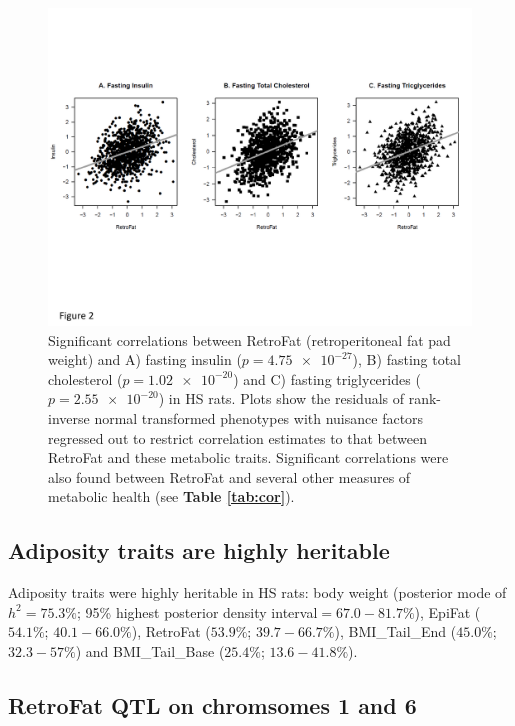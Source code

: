 \begin{figure}
\centering
\includegraphics[trim={0in 2in 0in 1.5in}, clip, width=\textwidth]{figures/5-hsrats/Figure2.pdf}
\caption[Significant correlations between adiposity and metabolic traits in HS rats]{Significant correlations between RetroFat (retroperitoneal fat pad weight) and A) fasting insulin ($p = \num{4.75e-27}$), B) fasting total cholesterol ($p = \num{1.02e-20}$) and C) fasting triglycerides ($p = \num{2.55e-20}$) in HS rats. Plots show the residuals of rank-inverse normal transformed phenotypes with nuisance factors regressed out to restrict correlation estimates to that between RetroFat and these metabolic traits. Significant correlations were also found between RetroFat and several other measures of metabolic health (see \textbf{Table \ref{tab:cor}}). \label{fig:adiposity_cor}}
\end{figure}

\subsection{Adiposity traits are highly heritable}

Adiposity traits were highly heritable in HS rats: body weight (posterior mode of $h^{2} = 75.3\%$; 95\% highest posterior density interval$ = 67.0-81.7\%$), EpiFat ($54.1\%$; $40.1-66.0\%$), RetroFat ($53.9\%$; $39.7-66.7\%$), BMI\_Tail\_End ($45.0\%$; $32.3-57\%$) and BMI\_Tail\_Base ($25.4\%$; $13.6-41.8\%$).

\subsection{RetroFat QTL on chromsomes 1 and 6}

